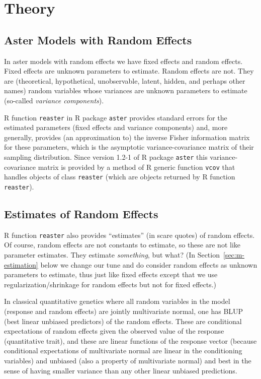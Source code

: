 \documentclass[11pt]{article}
\let\code=\texttt
\begin{document}
\section{Theory}

\subsection{Aster Models with Random Effects}

In aster models with random effects \citep*{reaster} we have fixed effects
and random effects.  Fixed effects are unknown parameters to estimate.
Random effects are not.  They are (theoretical, hypothetical, unobservable,
latent, hidden, and perhaps other names) random variables whose variances are
unknown parameters to estimate (so-called \emph{variance components}).

R function \code{reaster} in R package \code{aster} \citep{aster-package}
provides standard errors for the estimated parameters (fixed effects and
variance components) and, more generally, provides (an approximation to)
the inverse Fisher information matrix for these parameters, which is the
asymptotic variance-covariance matrix of their sampling distribution.
Since version 1.2-1 of R package \code{aster} this variance-covariance
matrix is provided by a method of R generic
function \code{vcov} that handles objects of class \code{reaster} (which
are objects returned by R function \code{reaster}).

\subsection{Estimates of Random Effects}

R function \code{reaster} also provides ``estimates'' (in scare quotes)
of random effects.  Of course, random effects are not constants to estimate,
so these are not like parameter estimates.  They estimate \emph{something}, but
what?  (In Section~\ref{sec:m-estimation} below we change our tune and do
consider random effects as unknown parameters to estimate, thus just like
fixed effects except that we use regularization/shrinkage for random
effects but not for fixed effects.)

In classical quantitative genetics where all random variables in the model
(response and random effects) are jointly multivariate normal, one has
BLUP (best linear unbiased predictors) of the random effects.  These
are conditional expectations of random effects given the observed value
of the response (quantitative trait), and these are linear functions
of the response vector (because conditional expectations of multivariate
normal are linear in the conditioning variables) and unbiased
(also a property of multivariate normal)
and best in the sense of having smaller variance than any other linear
unbiased predictions.
\end{document}
